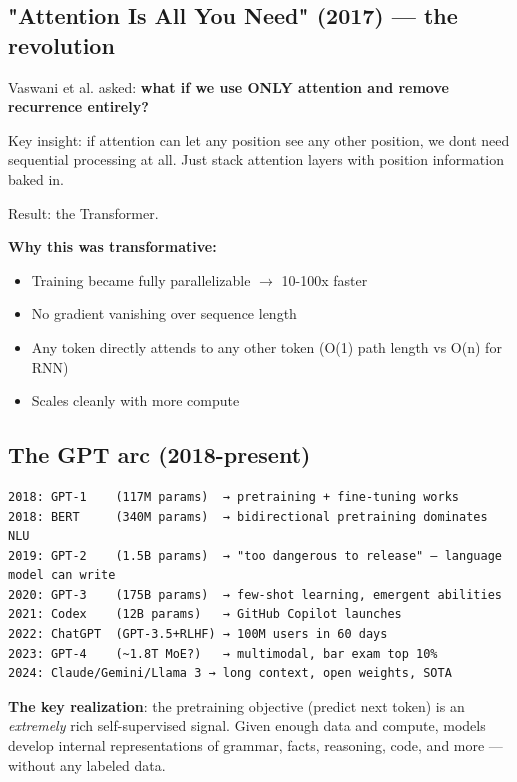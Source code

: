 \documentclass[11pt]{article}
\providecommand{\tightlist}{\setlength{\itemsep}{1pt}\setlength{\parskip}{0pt}}
\begin{document}
\subsection{"Attention Is All You Need" (2017) --- the revolution}\label{attention-is-all-you-need-2017--the-revolution}

Vaswani et al. asked: \textbf{what if we use ONLY attention and remove recurrence entirely?}

Key insight: if attention can let any position see any other position, we don\textquotesingle t need sequential processing at all. Just stack attention layers with position information baked in.

Result: the Transformer.

\textbf{Why this was transformative:}

\begin{itemize}
\tightlist
\item
  Training became fully parallelizable \(\rightarrow\) 10-100x faster
\item
  No gradient vanishing over sequence length
\item
  Any token directly attends to any other token (O(1) path length vs O(n) for RNN)
\item
  Scales cleanly with more compute
\end{itemize}

\subsection{The GPT arc (2018-present)}\label{the-gpt-arc-2018-present}

\setcodelang{}

\begin{verbatim}
2018: GPT-1    (117M params)  → pretraining + fine-tuning works
2018: BERT     (340M params)  → bidirectional pretraining dominates NLU
2019: GPT-2    (1.5B params)  → "too dangerous to release" — language model can write
2020: GPT-3    (175B params)  → few-shot learning, emergent abilities
2021: Codex    (12B params)   → GitHub Copilot launches
2022: ChatGPT  (GPT-3.5+RLHF) → 100M users in 60 days
2023: GPT-4    (~1.8T MoE?)   → multimodal, bar exam top 10%
2024: Claude/Gemini/Llama 3 → long context, open weights, SOTA
\end{verbatim}

\textbf{The key realization}: the pretraining objective (predict next token) is an \emph{extremely} rich self-supervised signal. Given enough data and compute, models develop internal representations of grammar, facts, reasoning, code, and more --- without any labeled data.
\end{document}
